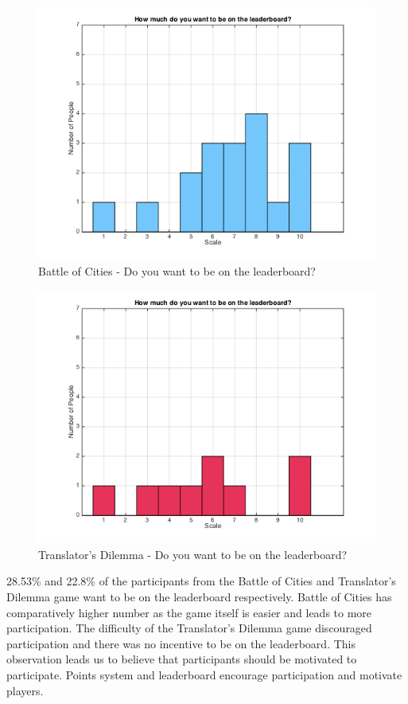 \documentclass{sig-alternate}
\begin{document}
\begin{figure}
	\includegraphics[width=\linewidth]{p_leaderboard.png}
	\caption{Battle of Cities - Do you want to be on the leaderboard?}
	\label{fig:p_leaderboard}
\end{figure}

\begin{figure}
	\includegraphics[width=\linewidth]{t_leaderboard.png}
	\caption{Translator's Dilemma - Do you want to be on the leaderboard?}
	\label{fig:t_leaderboard}
\end{figure}

28.53\% and 22.8\% of the participants from the Battle of Cities and Translator's Dilemma game want to be on the leaderboard respectively. Battle of Cities has comparatively higher number as the game itself is easier and leads to more participation. The difficulty of the Translator's Dilemma game discouraged participation and there was no incentive to be on the leaderboard. This observation leads us to believe that participants should be motivated to participate. Points system and leaderboard encourage participation and motivate players.
\end{document}
